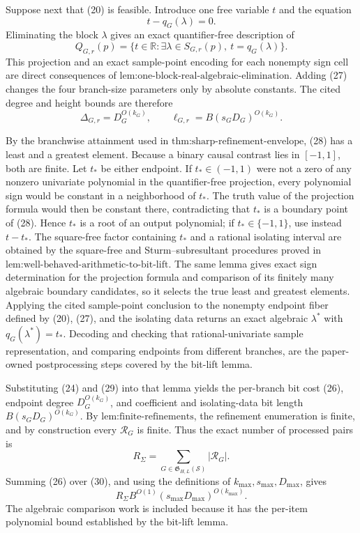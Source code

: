 Suppose next that (20) is feasible.  Introduce one free variable \(t\) and the equation
\[
t-q_G(\lambda)=0.
\tag{27}
\]
Eliminating the block \(\lambda\) gives an exact quantifier-free description of
\[
Q_{G,r}(p)=\{t\in\mathbb R:\exists\lambda\in S_{G,r}(p),\ t=q_G(\lambda)\}.
\tag{28}
\]
This projection and an exact sample-point encoding for each nonempty sign cell are direct consequences of \(\text{lem:one-block-real-algebraic-elimination}\).  Adding (27) changes the four branch-size parameters only by absolute constants.  The cited degree and height bounds are therefore
\[
\Delta_{G,r}=D_G^{O(k_G)},
\qquad
\ell_{G,r}=B(s_GD_G)^{O(k_G)}.
\tag{29}
\]

By the branchwise attainment used in \(\text{thm:sharp-refinement-envelope}\), (28) has a least and a greatest element.  Because a binary causal contrast lies in \([-1,1]\), both are finite.  Let \(t_*\) be either endpoint.  If \(t_*\in(-1,1)\) were not a zero of any nonzero univariate polynomial in the quantifier-free projection, every polynomial sign would be constant in a neighborhood of \(t_*\).  The truth value of the projection formula would then be constant there, contradicting that \(t_*\) is a boundary point of (28).  Hence \(t_*\) is a root of an output polynomial; if \(t_*\in\{-1,1\}\), use instead \(t-t_*\).  The square-free factor containing \(t_*\) and a rational isolating interval are obtained by the square-free and Sturm--subresultant procedures proved in \(\text{lem:well-behaved-arithmetic-to-bit-lift}\).  The same lemma gives exact sign determination for the projection formula and comparison of its finitely many algebraic boundary candidates, so it selects the true least and greatest elements.  Applying the cited sample-point conclusion to the nonempty endpoint fiber defined by (20), (27), and the isolating data returns an exact algebraic \(\lambda^*\) with \(q_G(\lambda^*)=t_*\).  Decoding and checking that rational-univariate sample representation, and comparing endpoints from different branches, are the paper-owned postprocessing steps covered by the bit-lift lemma.

Substituting (24) and (29) into that lemma yields the per-branch bit cost (26), endpoint degree \(D_G^{O(k_G)}\), and coefficient and isolating-data bit length \(B(s_GD_G)^{O(k_G)}\).  By \(\text{lem:finite-refinements}\), the refinement enumeration is finite, and by construction every \(\mathcal R_G\) is finite.  Thus the exact number of processed pairs is
\[
R_{\Sigma}=\sum_{G\in\mathfrak G_{H,L}(\mathcal S)}|\mathcal R_G|.
\tag{30}
\]
Summing (26) over (30), and using the definitions of \(k_{\max},s_{\max},D_{\max}\), gives
\[
R_{\Sigma}B^{O(1)}(s_{\max}D_{\max})^{O(k_{\max})}.
\tag{31}
\]
The algebraic comparison work is included because it has the per-item polynomial bound established by the bit-lift lemma.

